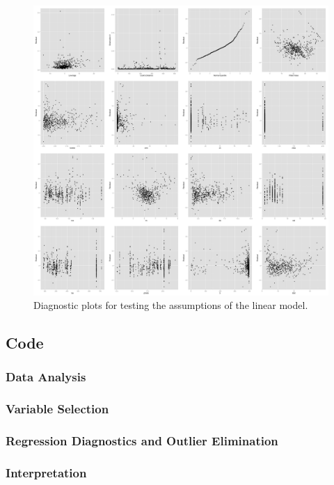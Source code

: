 \documentclass[12pt]{article}
\begin{document}
\begin{figure}[hp]
\centering
\includegraphics[width=180mm]{diagnostics.png}
\caption{Diagnostic plots for testing the assumptions of the linear model.}
\end{figure}

\pagebreak

\subsection{Code}
\subsubsection{Data Analysis}

\subsubsection{Variable Selection}

\subsubsection{Regression Diagnostics and Outlier Elimination}

\subsubsection{Interpretation}

\end{document}
